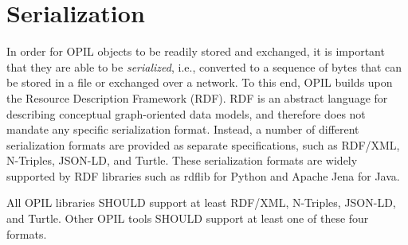 \section{Serialization}
\label{sec:serialization}

In order for OPIL objects to be readily stored and exchanged, it is important that they are able to be {\em serialized}, i.e., converted to a sequence of bytes that can be stored in a file or exchanged over a network.  
%
To this end, OPIL builds upon the Resource Description Framework (RDF).  RDF is an abstract language for describing conceptual graph-oriented data models, and therefore does not mandate any specific serialization format.  Instead, a number of different serialization formats are provided as separate specifications, such as RDF/XML, N-Triples, JSON-LD, and Turtle.  These serialization formats are widely supported by RDF libraries such as rdflib for Python and Apache Jena for Java.

All OPIL libraries SHOULD support at least RDF/XML, N-Triples, JSON-LD, and Turtle.
Other OPIL tools SHOULD support at least one of these four formats.

